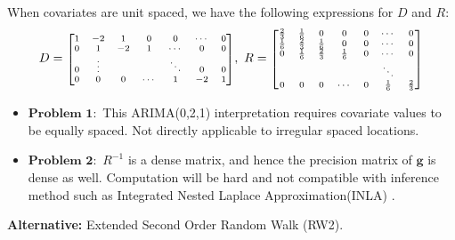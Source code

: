 \documentclass{beamer} %
\begin{document}
\begin{frame}
When covariates are unit spaced, we have the following expressions for $D$ and $R$:
\pause
\begin{equation}
\begin{aligned}
D = \mbox{\scriptsize $\begin{bmatrix}
1 & -2 & 1 & 0 & 0 & \cdots & 0\\
0 & 1 & -2 & 1 & \cdots & 0 & 0\\
0 & \vdots &  &  & \ddots & 0 & 0\\
0 & 0 & 0 & \cdots & 1 & -2 & 1\\
\end{bmatrix}$}, \ 
R = \mbox{\scriptsize $\begin{bmatrix}
\frac{2}{3} & \frac{1}{6} & 0 & 0 & 0 & \cdots & 0\\
\frac{1}{6} & \frac{2}{3} & \frac{1}{6} & 0 & 0 & \cdots & 0\\
0 & \frac{1}{6} & \frac{2}{3} & \frac{1}{6} & 0 & \cdots & 0\\
 &  &  &  &  & \ddots & \\
0 & 0 & 0 & \cdots & 0 & \frac{1}{6} & \frac{2}{3}\\
\end{bmatrix}$}
\end{aligned}
\end{equation}

\pause
\end{frame}



\begin{frame}

\begin{itemize}

\pause
\item $\textbf{Problem 1}:$ This ARIMA(0,2,1) interpretation requires covariate values to be equally spaced. Not directly applicable to irregular spaced locations.

\pause
\item $\textbf{Problem 2}:$ $R^{-1}$ is a dense matrix, and hence the precision matrix of $\boldsymbol{g}$ is dense as well. Computation will be hard and not compatible with inference method such as Integrated Nested Laplace Approximation(INLA) \citep{inla}.
\end{itemize}

\pause
\textbf{Alternative:} Extended Second Order Random Walk (RW2). 

\end{frame}
\end{document}
